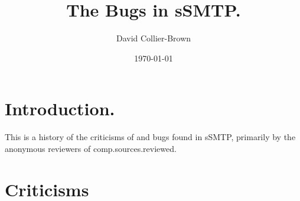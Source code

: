 \title{The Bugs in sSMTP.}
\author{David Collier-Brown}
\date{\today}

\maketitle

\section{Introduction.}
  This is a history of the criticisms of and bugs found in sSMTP,
primarily by the anonymous reviewers of comp.sources.reviewed.

\section{Criticisms}
